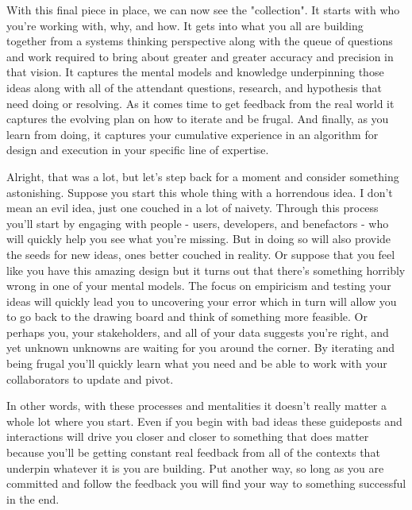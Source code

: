 \documentclass[11pt]{book}
\begin{document}
With this final piece in place, we can now see the "collection". It starts with who you're working with, why, and how. It gets into what you all are building together from a systems thinking perspective along with the queue of questions and work required to bring about greater and greater accuracy and precision in that vision. It captures the mental models and knowledge underpinning those ideas along with all of the attendant questions, research, and hypothesis that need doing or resolving. As it comes time to get feedback from the real world it captures the evolving plan on how to iterate and be frugal. And finally, as you learn from doing, it captures your cumulative experience in an algorithm for design and execution in your specific line of expertise.
\newline

Alright, that was a lot, but let's step back for a moment and consider something astonishing. Suppose you start this whole thing with a horrendous idea. I don't mean an evil idea, just one couched in a lot of naivety. Through this process you'll start by engaging with people - users, developers, and benefactors - who will quickly help you see what you're missing. But in doing so will also provide the seeds for new ideas, ones better couched in reality. Or suppose that you feel like you have this amazing design but it turns out that there's something horribly wrong in one of your mental models. The focus on empiricism and testing your ideas will quickly lead you to uncovering your error which in turn will allow you to go back to the drawing board and think of something more feasible. Or perhaps you, your stakeholders, and all of your data suggests you're right, and yet unknown unknowns are waiting for you around the corner. By iterating and being frugal you'll quickly learn what you need and be able to work with your collaborators to update and pivot.
\newline

In other words, with these processes and mentalities it doesn't really matter a whole lot where you start. Even if you begin with bad ideas these guideposts and interactions will drive you closer and closer to something that does matter because you'll be getting constant real feedback from all of the contexts that underpin whatever it is you are building. Put another way, so long as you are committed and follow the feedback you will find your way to something successful in the end. 
\newline
\end{document}
